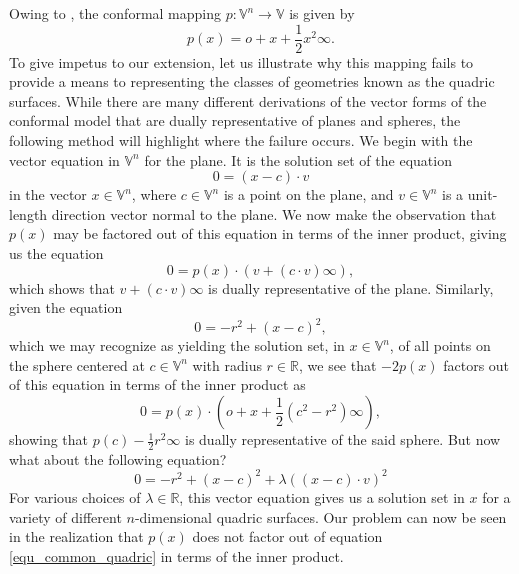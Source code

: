\documentclass{birkjour}
\theoremstyle{definition}
\theoremstyle{remark}
\numberwithin{equation}{section}
\newcommand{\V}{\mathbb{V}}
\newcommand{\R}{\mathbb{R}}
\newcommand{\nvao}{o}
\newcommand{\nvai}{\infty}
\begin{document}
Owing to \cite{}, the conformal mapping $p:\V^n\to\V$ is given by
\begin{equation}
p(x)=\nvao+x+\frac{1}{2}x^2\nvai.
\end{equation}
To give impetus to our extension, let us illustrate why this mapping fails to provide
a means to representing the classes of geometries known as the quadric surfaces.
While there are many different derivations
of the vector forms of the conformal model that are dually representative of planes and spheres, the following
method will highlight where the failure occurs.  We begin with the vector equation in $\V^n$
for the plane.  It is the solution set of the equation
\begin{equation}\label{equ_plane}
0 = (x-c)\cdot v
\end{equation}
in the vector $x\in\V^n$, where $c\in\V^n$ is a point on the plane, and $v\in\V^n$ is
a unit-length direction vector normal to the plane.  We now make the observation that
$p(x)$ may be factored out of this equation in terms of the inner product, giving us
the equation
\begin{equation}
0 = p(x)\cdot(v+(c\cdot v)\nvai),
\end{equation}
which shows that $v+(c\cdot v)\nvai$ is dually representative of the plane.  Similarly,
given the equation
\begin{equation}\label{equ_sphere}
0 = -r^2+(x-c)^2,
\end{equation}
which we may recognize as yielding the solution set, in $x\in\V^n$, of all points
on the sphere centered at $c\in\V^n$ with radius $r\in\R$, we see that $-2p(x)$ factors
out of this equation in terms of the inner product as
\begin{equation}
0=p(x)\cdot\left(\nvao+x+\frac{1}{2}(c^2-r^2)\nvai\right),
\end{equation}
showing that $p(c)-\frac{1}{2}r^2\nvai$ is dually representative of the said sphere.
But now what about the following equation?
\begin{equation}\label{equ_common_quadric}
0 = -r^2 + (x-c)^2 + \lambda((x-c)\cdot v)^2
\end{equation}
For various choices of $\lambda\in\R$, this vector equation gives us a solution set
in $x$ for a variety of different $n$-dimensional quadric surfaces.  Our problem can
now be seen in the realization that $p(x)$ does not factor out of equation \eqref{equ_common_quadric}
in terms of the inner product.
\end{document}

